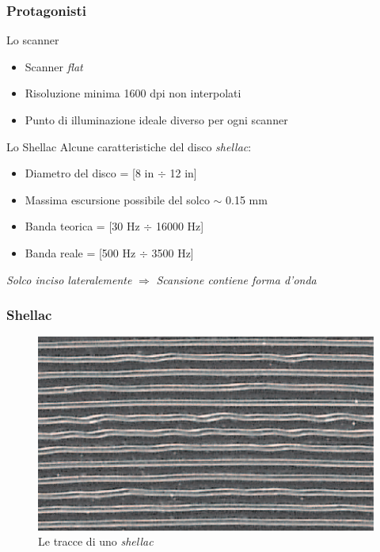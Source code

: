 \begin{frame}

\frametitle{Protagonisti}

\begin{block}{Lo scanner}
\begin{itemize}
\item Scanner \emph{flat}
\item Risoluzione minima 1600 dpi non interpolati
\item Punto di illuminazione ideale diverso per ogni scanner
\end{itemize}
\end{block}
\begin{block}{Lo Shellac}
Alcune caratteristiche del disco \emph{shellac}:
\begin{itemize}
\item Diametro del disco = [8 in $\div$ 12 in]
\item Massima escursione possibile del solco $\sim$ 0.15 mm
\item Banda teorica = [30 Hz $\div$ 16000 Hz]
\item Banda reale = [500 Hz $\div$ 3500 Hz] 
\end{itemize}
\begin{center}
\emph{Solco inciso lateralemente} $\Rightarrow$ \emph{Scansione contiene forma d'onda}
\end{center}
\vspace{0.2cm}
\end{block}
\end{frame}


\begin{frame}
\frametitle{Shellac}
\begin{figure}
\includegraphics[width=\textwidth]{immagini/shellac-track.png}
\caption{Le tracce di uno \emph{shellac}}
\end{figure}
\end{frame}


